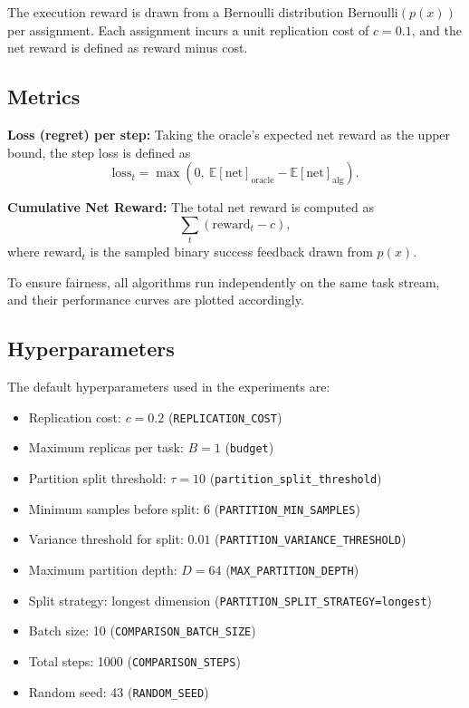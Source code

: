 The execution reward is drawn from a Bernoulli distribution $\text{Bernoulli}(p(x))$ per assignment. Each assignment incurs a unit replication cost of $c=0.1$, and the net reward is defined as reward minus cost.

\subsection{Metrics}

\textbf{Loss (regret) per step:} Taking the oracle’s expected net reward as the upper bound, the step loss is defined as
\[
\text{loss}_t = \max\left(0, \ \mathbb{E}[\text{net}]_{\text{oracle}} - \mathbb{E}[\text{net}]_{\text{alg}}\right).
\]

\textbf{Cumulative Net Reward:} The total net reward is computed as
\[
\sum_{t} (\text{reward}_t - c),
\]
where $\text{reward}_t$ is the sampled binary success feedback drawn from $p(x)$.

To ensure fairness, all algorithms run independently on the same task stream, and their performance curves are plotted accordingly.

\subsection{Hyperparameters}

The default hyperparameters used in the experiments are:

\begin{itemize}
    \item Replication cost: $c = 0.2$ (\texttt{REPLICATION\_COST})
    \item Maximum replicas per task: $B = 1$ (\texttt{budget})
    \item Partition split threshold: $\tau = 10$ (\texttt{partition\_split\_threshold})
    \item Minimum samples before split: $6$ (\texttt{PARTITION\_MIN\_SAMPLES})
    \item Variance threshold for split: $0.01$ (\texttt{PARTITION\_VARIANCE\_THRESHOLD})
    \item Maximum partition depth: $D = 64$ (\texttt{MAX\_PARTITION\_DEPTH})
    \item Split strategy: longest dimension (\texttt{PARTITION\_SPLIT\_STRATEGY=longest})
    \item Batch size: 10 (\texttt{COMPARISON\_BATCH\_SIZE})
    \item Total steps: 1000 (\texttt{COMPARISON\_STEPS})
    \item Random seed: 43 (\texttt{RANDOM\_SEED})
\end{itemize}


